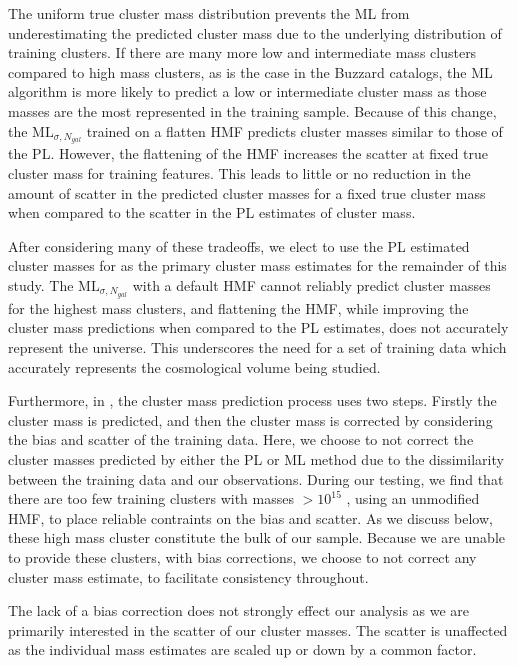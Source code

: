 The uniform true cluster mass distribution prevents the ML from underestimating the predicted cluster mass due to the underlying distribution of training clusters. If there are many more low and intermediate mass clusters compared to high mass clusters, as is the case in the Buzzard catalogs, the ML algorithm is more likely to predict a low or intermediate cluster mass as those masses are the most represented in the training sample. Because of this change, the $\mathrm{ML}_{\sigma, N_{gal}}$ trained on a flatten HMF predicts cluster masses similar to those of the PL. However, the flattening of the HMF increases the scatter at fixed true cluster mass for training features. This leads to little or no reduction in the amount of scatter in the predicted cluster masses for a fixed true cluster mass when compared to the scatter in the PL estimates of cluster mass.

After considering many of these tradeoffs, we elect to use the PL estimated cluster masses for as the primary cluster mass estimates for the remainder of this study. The $\mathrm{ML}_{\sigma, N_{gal}}$ with a default HMF cannot reliably predict cluster masses for the highest mass clusters, and flattening the HMF, while improving the cluster mass predictions when compared to the PL estimates, does not accurately represent the universe. This underscores the need for a set of training data which accurately represents the cosmological volume being studied.

Furthermore, in , the cluster mass prediction process uses two steps. Firstly the cluster mass is predicted, and then the cluster mass is corrected by considering the bias and scatter of the training data. Here, we choose to not correct the cluster masses predicted by either the PL or ML method due to the dissimilarity between the training data and our observations. During our testing, we find that there are too few training clusters with masses $> 10^{15}$ \Msol, using an unmodified HMF, to place reliable contraints on the bias and scatter. As we discuss below, these high mass cluster constitute the bulk of our sample. Because we are unable to provide these clusters, with bias corrections, we choose to not correct any cluster mass estimate, to facilitate consistency throughout. 

The lack of a bias correction does not strongly effect our analysis as we are primarily interested in the scatter of our cluster masses. The scatter is unaffected as the individual mass estimates are scaled up or down by a common factor.

